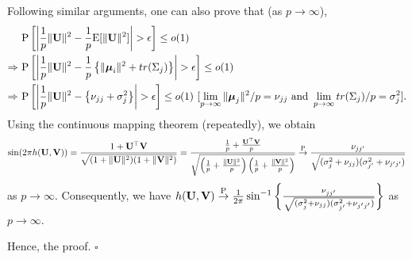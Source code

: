 \documentclass[twoside]{article}
\newcommand{\bU}{\mathbf{U}}
\newcommand{\bV}{\mathbf{V}}
\newcommand{\bmu}{\boldsymbol{\mu}}
\newcommand{\0}{\mathbf{0}}
\newcommand{\1}{\mathbf{1}}
\newcommand*{\QEDB}{\hfill\ensuremath{\square}}
\numberwithin{equation}{section}
\begin{document}
Following similar arguments, one can also prove that (as $p\to\infty$),
\begin{align*}
&\ {\rm P}\left [\left |\frac{1}{p}\|\bU\|^2 - \frac{1}{p}{\rm E}[\|\bU\|^2]\right |>\epsilon\right ]\leq o(1)\\
\Rightarrow &\ {\rm P}\left [\left |\frac{1}{p}\|\bU\|^2 - \frac{1}{p}\left \{\|\bmu_i\|^2 + tr (\Sigma_j)\right \}\right |>\epsilon\right ]\leq o(1)\\
\Rightarrow &\ {\rm P}\left [\left |\frac{1}{p}\|\bU\|^2 - \left \{\nu_{jj} + \sigma^2_j\right \}\right |>\epsilon\right ]\leq o(1)\ [\lim_{p\to\infty}\|\bmu_j\|^2/p=\nu_{jj}\text{ and }\lim_{p\to\infty}tr (\Sigma_j)/p=\sigma^2_j].
\end{align*}
Using the continuous mapping theorem (repeatedly), we obtain
$$\sin (2\pi h(\bU,\bV))=\frac{1+\bU^\top\bV}{\sqrt{(1+\|\bU\|^2)(1+\|\bV\|^2)}}=\frac{\frac{1}{p}+\frac{\bU^\top\bV}{p}}{\sqrt{\left (\frac{1}{p}+\frac{\|\bU\|^2}{p}\right )\left(\frac{1}{p}+\frac{\|\bV\|^2}{p}\right)}}\stackrel{\rm P}{\to}\frac{\nu_{jj^\prime}}{\sqrt{(\sigma^2_j+\nu_{jj})(\sigma^2_{j^\prime}+\nu_{j^\prime j^\prime})}}$$ as $p\to\infty$. Consequently, we have $h(\bU,\bV)\stackrel{\rm P}{\to}\frac{1}{2\pi}\sin^{-1}\left \{\frac{\nu_{jj^\prime}}{\sqrt{(\sigma^2_j+\nu_{jj})(\sigma^2_{j^\prime}+\nu_{j^\prime j^\prime})}}\right\}$ as $p\to\infty$.

Hence, the proof. \hfill\QEDB\newline
\end{document}
